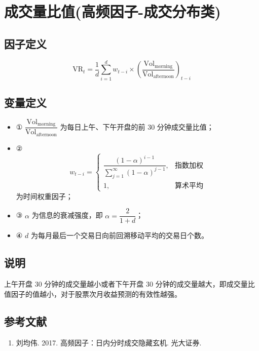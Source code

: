\documentclass{article}
\begin{document}
\section{成交量比值(高频因子-成交分布类)}

\subsection{因子定义}
\begin{equation}
    \mathrm{VR}_t = \frac{1}{d} \sum_{i=1}^{d} w_{t-i} \times \left( \frac{\mathrm{Vol}_{\mathrm{morning}}}{\mathrm{Vol}_{\mathrm{afternoon}}} \right)_{t-i}
\end{equation}

\subsection{变量定义}
\begin{itemize}
    \item ① \( \dfrac{\mathrm{Vol}_{\mathrm{morning}}}{\mathrm{Vol}_{\mathrm{afternoon}}} \) 为每日上午、下午开盘的前 30 分钟成交量比值；
    \item ②
        \begin{equation*}
            w_{t-i} = 
            \begin{cases} 
                \dfrac{(1-\alpha)^{i-1}}{\sum_{j=1}^{\infty}(1-\alpha)^{j-1}}, & \text{指数加权} \\[6pt]
                1, & \text{算术平均}
            \end{cases}
        \end{equation*}
        为时间权重因子；
    \item ③ \( \alpha \) 为信息的衰减强度，即 \( \alpha = \dfrac{2}{1+d} \)；
    \item ④ \( d \) 为每月最后一个交易日向前回溯移动平均的交易日个数。
\end{itemize}

\subsection{说明}
上午开盘 30 分钟的成交量越小或者下午开盘 30 分钟的成交量越大，即成交量比值因子的值越小，对于股票次月收益预测的有效性越强。

\subsection{参考文献}
\begin{enumerate}
    \item 刘均伟. 2017. 高频因子：日内分时成交隐藏玄机. 光大证券.
\end{enumerate}
\end{document}
